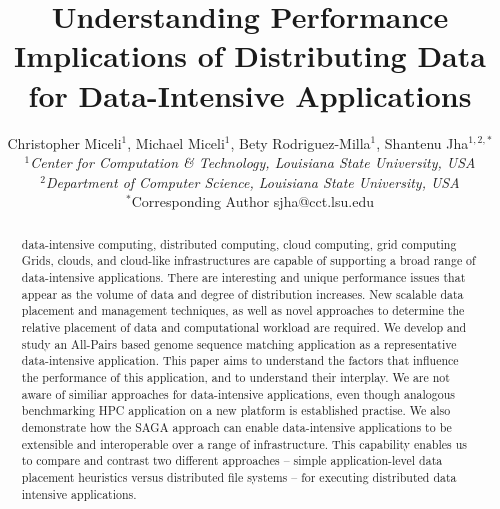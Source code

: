 \documentclass{rspublic}
\title[Understanding Performance Implications of Distributing Data for
Data-Intensive Applications]{Understanding Performance Implications of
Distributing Data for Data-Intensive Applications}
\author[Miceli, Miceli, Rodriguez-Milla, Jha]{ Christopher Miceli$^{1}$,
Michael Miceli$^{1}$, Bety Rodriguez-Milla$^{1}$, Shantenu Jha$^{1,2,*}$ \\
\small{\emph{$^{1}$Center for Computation \& Technology, Louisiana State
University, USA}} \\  \small{\emph{$^{2}$Department of Computer Science,
Louisiana State University, USA}} \\ {\footnotesize {\hspace{0.0 in}
$^*$Corresponding Author sjha@cct.lsu.edu}} }
\newcommand{\micnote}[1]{ {\textcolor{blue} { ***Michael: #1 }}}
\begin{document}
 \maketitle


\begin{abstract}{data-intensive computing, distributed computing,
cloud computing, grid computing} 
Grids, clouds, and cloud-like infrastructures are capable of supporting
a broad range of data-intensive applications. There are interesting
and unique performance issues that appear as the volume of data and
degree of distribution increases. New scalable data placement and
management techniques, as well as novel approaches to determine the
relative placement of data and computational workload are required. We
develop and study an All-Pairs based genome sequence matching
application as a representative data-intensive application.  This
paper aims to understand the factors that influence the performance of
this application, and to understand their interplay.  We are not aware
of similiar approaches for data-intensive applications, even though
analogous benchmarking HPC application on a new platform is
established practise.  We also demonstrate how the SAGA approach can
enable data-intensive applications to be extensible and interoperable
over a range of infrastructure. This capability enables us to compare
and contrast two different approaches -- simple application-level data
placement heuristics versus distributed file systems -- for executing
distributed data intensive applications.


\end{abstract}
\end{document}
